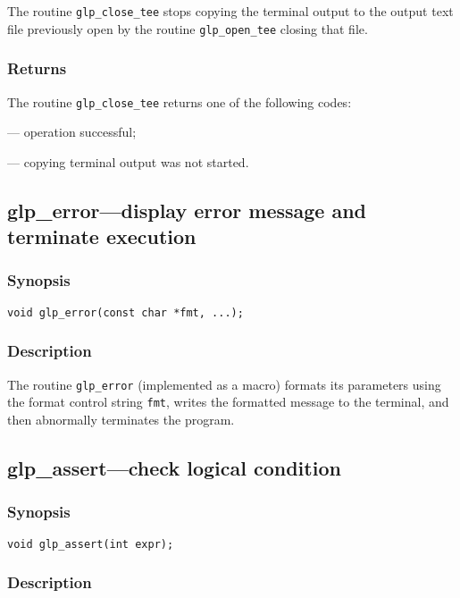 The routine \verb|glp_close_tee| stops copying the terminal output to
the output text file previously open by the routine \verb|glp_open_tee|
closing that file.

\subsubsection*{Returns}

The routine \verb|glp_close_tee| returns one of the following codes:

 --- operation successful;

 --- copying terminal output was not started.

\newpage

\subsection{glp\_error---display error message and terminate execution}

\subsubsection*{Synopsis}

\begin{verbatim}
void glp_error(const char *fmt, ...);
\end{verbatim}

\subsubsection*{Description}

The routine \verb|glp_error| (implemented as a macro) formats its
parameters using the format control string \verb|fmt|, writes the
formatted message to the terminal, and then abnormally terminates the
program.

\subsection{glp\_assert---check logical condition}

\subsubsection*{Synopsis}

\begin{verbatim}
void glp_assert(int expr);
\end{verbatim}

\subsubsection*{Description}

